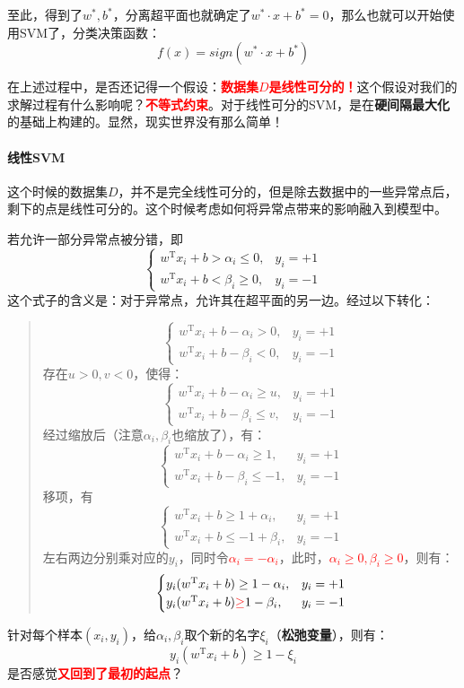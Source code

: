 至此，得到了$w^*, b^*$，分离超平面也就确定了$w^* \cdot x + b^* = 0$，那么也就可以开始使用SVM了，分类决策函数：
$$
f(x) = sign(w^* \cdot x + b^*)
$$

在上述过程中，是否还记得一个假设：\textbf{\textcolor{red}{数据集$D$是线性可分的！}}这个假设对我们的求解过程有什么影响呢？\textbf{\textcolor{red}{不等式约束}}。对于线性可分的SVM，是在\textbf{硬间隔最大化}的基础上构建的。显然，现实世界没有那么简单！

\paragraph{线性SVM}
这个时候的数据集$D$，并不是完全线性可分的，但是除去数据中的一些异常点后，剩下的点是线性可分的。这个时候考虑如何将异常点带来的影响融入到模型中。

若允许一部分异常点被分错，即
$$
\begin{cases}
	{w}^{\mathrm{T}} {x}_{i}+b > \alpha_i \leq 0, & y_{i}=+1 \\ 
	{w}^{\mathrm{T}} {x}_{i}+b < \beta_i \geq 0, & y_{i}=-1
\end{cases}
$$ 
这个式子的含义是：对于异常点，允许其在超平面的另一边。经过以下转化：
\begin{quotation}
	$$
	\begin{cases}
		{w}^{\mathrm{T}} {x}_{i}+b - \alpha_i > 0, & y_{i}=+1 \\ 
		{w}^{\mathrm{T}} {x}_{i}+b - \beta_i < 0, & y_{i}=-1
	\end{cases}
	$$
	存在$u >0, v < 0$，使得：
	$$
	\begin{cases}
		{w}^{\mathrm{T}} {x}_{i}+b - \alpha_i \geq u, & y_{i}=+1 \\ 
		{w}^{\mathrm{T}} {x}_{i}+b - \beta_i \leq v, & y_{i}=-1
	\end{cases}
	$$
	经过缩放后（注意$\alpha_i, \beta_i$也缩放了），有：
	$$
	\begin{cases}
		{w}^{\mathrm{T}} {x}_{i}+b - \alpha_i \geq 1, & y_{i}=+1 \\ 
		{w}^{\mathrm{T}} {x}_{i}+b - \beta_i \leq -1, & y_{i}=-1
	\end{cases}
	$$
	移项，有
	$$
	\begin{cases}
		{w}^{\mathrm{T}} {x}_{i}+b \geq 1 + \alpha_i, & y_{i}=+1 \\ 
		{w}^{\mathrm{T}} {x}_{i}+b \leq -1 + \beta_i , & y_{i}=-1
	\end{cases}
	$$
	左右两边分别乘对应的$y_i$，同时令\textcolor{red}{$\alpha_i = -\alpha_i$}，此时，\textbf{\textcolor{red}{$\alpha_i \geq 0, \beta_i \geq 0$}}，则有：
	$$
	\begin{cases}
		y_i( {w}^{\mathrm{T}} {x}_{i}+b ) \geq 1 - \alpha_i, & y_{i}=+1 \\ 
		y_i( {w}^{\mathrm{T}} {x}_{i}+b) \textcolor{red}{\geq} 1 - \beta_i , & y_{i}=-1
	\end{cases}
	$$	
\end{quotation}
针对每个样本$(x_i, y_i)$，给$\alpha_i, \beta_i$取个新的名字$\xi_i$（\textbf{松弛变量}），则有：
$$
y_i( {w}^{\mathrm{T}} {x}_{i}+b ) \geq 1 - \xi_i
$$
是否感觉\textbf{\textcolor{red}{又回到了最初的起点}}？

